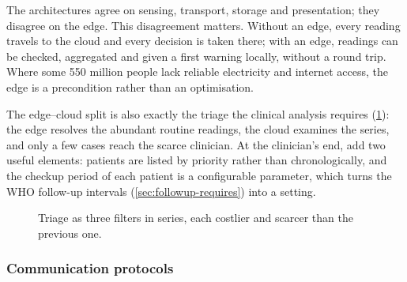 The architectures agree on sensing, transport, storage and presentation; they disagree on the edge. This disagreement matters. Without an edge, every reading travels to the cloud and every decision is taken there; with an edge, readings can be checked, aggregated and given a first warning locally, without a round trip. Where some 550 million people lack reliable electricity and internet access, the edge is a precondition rather than an optimisation.

The edge--cloud split is also exactly the triage the clinical analysis requires (\cref{fig:triage-cascade}): the edge resolves the abundant routine readings, the cloud examines the series, and only a few cases reach the scarce clinician. At the clinician's end, \textcite{yazdani2018} add two useful elements: patients are listed by priority rather than chronologically, and the checkup period of each patient is a configurable parameter, which turns the WHO follow-up intervals (\cref{sec:followup-requires}) into a setting.

\begin{figure}[htbp]
\centering
{}
\caption{Triage as three filters in series, each costlier and scarcer than the previous one.}\label{fig:triage-cascade}
\end{figure}

\subsubsection{Communication protocols}\label{sec:protocols-cloud}

